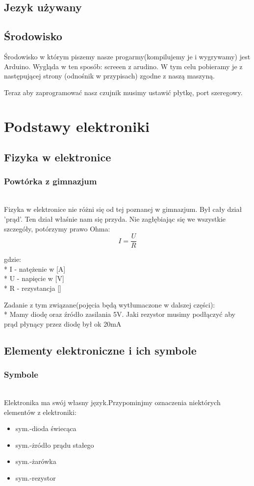 	\subsection{Jezyk używany}
	\subsection{Środowisko}
		Środowisko w którym piszemy nasze progarmy(kompilujemy je i wygrywamy) jest Arduino. Wygląda w ten sposób: screeen z arudino. 
W tym celu pobieramy je z następującej strony (odnośnik w przypisach) zgodne z naszą maszyną.

Teraz aby zaprogramować nasz czujnik musimy ustawić płytkę, port szeregowy.%
\section{Podstawy elektroniki}
 \subsection{Fizyka w elektronice}
	\subsubsection{Powtórka z gimnazjum}
	\\Fizyka w elektronice nie różni się od tej poznanej w gimnazjum. Był cały dział 'prąd'. Ten dział właśnie nam się przyda. Nie zagłębiając się we wszystkie szczegóły, potórzymy prawo Ohma:
	\[I=\frac{U}{R}\]

	gdzie:\\*
	I - natężenie w [A] \\*
	U - napięcie w [V] \\*
	R - rezystancja [\Omega]
			

Zadanie z tym związane(pojęcia będą wytłumaczone w dalszej części): \\* Mamy diodę oraz źródło zasilania 5V. Jaki rezystor musimy podłączyć aby prąd płynący przez diodę był ok 20mA %
	\subsection{Elementy elektroniczne i ich symbole}
	\subsubsection {Symbole}
	\\Elektronika ma swój własny język.Przypominjmy oznaczenia niektórych elementów z elektroniki:
\begin{itemize}
	\item sym.-dioda świecąca
	\item sym.-żródło prądu stałego
	\item sym.-żarówka
	\item sym.-rezystor
\end{itemize}

